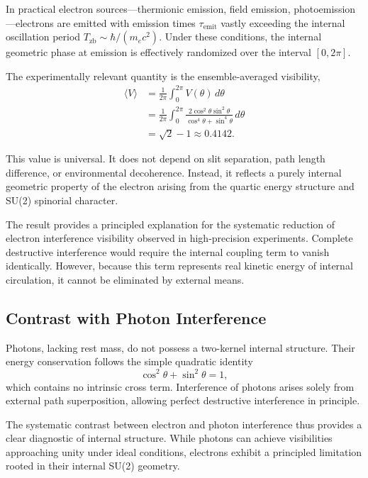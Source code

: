 \documentclass[%
 reprint,
 amsmath,amssymb,
 aps,
 prb,
]{revtex4-2}
\numberwithin{equation}{section}
\begin{document}
In practical electron sources---thermionic emission, field emission, photoemission---electrons are emitted with emission times $\tau_{\mathrm{emit}}$ vastly exceeding the internal oscillation period $T_{\mathrm{zb}} \sim \hbar/(m_e c^2)$. Under these conditions, the internal geometric phase at emission is effectively randomized over the interval $[0, 2\pi]$.

The experimentally relevant quantity is the ensemble-averaged visibility,
\begin{equation}
\begin{aligned}
\langle V \rangle &= \frac{1}{2\pi} \int_0^{2\pi} V(\theta) \, d\theta \\
&= \frac{1}{2\pi} \int_0^{2\pi} \frac{2\cos^2\theta\sin^2\theta}{\cos^4\theta + \sin^4\theta} \, d\theta \\
&= \sqrt{2} - 1 \approx 0.4142.
\end{aligned}
\label{eq:ensemble_visibility}
\end{equation}

This value is universal. It does not depend on slit separation, path length difference, or environmental decoherence. Instead, it reflects a purely internal geometric property of the electron arising from the quartic energy structure and SU(2) spinorial character.

The result provides a principled explanation for the systematic reduction of electron interference visibility observed in high-precision experiments. Complete destructive interference would require the internal coupling term to vanish identically. However, because this term represents real kinetic energy of internal circulation, it cannot be eliminated by external means.


\subsection{Contrast with Photon Interference}
\label{subsec:photon_contrast}

Photons, lacking rest mass, do not possess a two-kernel internal structure. Their energy conservation follows the simple quadratic identity
\begin{equation}
\cos^2\theta + \sin^2\theta = 1,
\label{eq:photon_identity}
\end{equation}
which contains no intrinsic cross term. Interference of photons arises solely from external path superposition, allowing perfect destructive interference in principle.

The systematic contrast between electron and photon interference thus provides a clear diagnostic of internal structure. While photons can achieve visibilities approaching unity under ideal conditions, electrons exhibit a principled limitation rooted in their internal SU(2) geometry.
\end{document}
